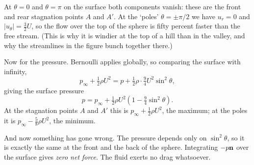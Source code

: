 \documentclass[a4paper]{scrartcl}
\begin{document}
\begin{example}
\begin{center}
	\end{center}
	At $\theta = 0$ and $\theta = \pi$ on the surface both components vanish: these are the front and rear stagnation points $A$ and $A'$. At the `poles' $\theta = \pm\pi/2$ we have $u_r = 0$ and $|u_\theta| = \tfrac{3}{2}U$, so the flow over the top of the sphere is fifty percent faster than the free stream. (This is why it is windier at the top of a hill than in the valley, and why the streamlines in the figure bunch together there.)

	Now for the pressure. Bernoulli applies globally, so comparing the surface with infinity,
	$$
	p_\infty + \tfrac{1}{2}\rho U^2 = p + \tfrac{1}{2}\rho \cdot \tfrac{9}{4}U^2 \sin^2\theta,
	$$
	giving the surface pressure
	$$
	p = p_\infty + \tfrac{1}{2}\rho U^2\left(1 - \tfrac{9}{4}\sin^2\theta\right).
	$$
	At the stagnation points $A$ and $A'$ this is $p_\infty + \tfrac{1}{2}\rho U^2$, the maximum; at the poles it is $p_\infty - \tfrac{5}{8}\rho U^2$, the minimum.

	And now something has gone wrong. The pressure depends only on $\sin^2\theta$, so it is exactly the same at the front and the back of the sphere. Integrating $-p\mathbf{n}$ over the surface gives \emph{zero net force}. The fluid exerts no drag whatsoever.
\end{example}
\end{document}
